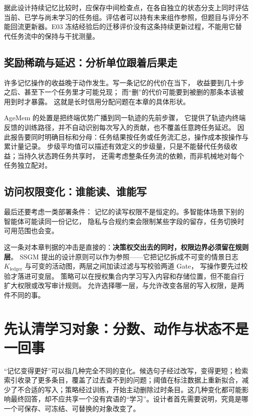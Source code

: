 据此设计持续记忆比较时，应保存中间检查点，在各自独立的状态分支上同时评估当前、已学与尚未学习的任务组。评估者可以持有未来组作参照，但题目与评分不能回流更新器。E03 冻结经验后的迁移评价没有这条持续更新过程，不能用它替代任务流中的保持与干扰测量。

\subsection*{奖励稀疏与延迟：分析单位跟着后果走}

许多记忆操作的收益晚于动作发生。写一条记忆的代价在当下，
收益要到几十步之后、甚至下一个任务里才可能兑现；
而“删”的代价可能要到被删的那条本该被用到时才暴露。
这就是长时信用分配问题在本章的具体形状。

AgeMem 的处置是把终端优势广播到同一轨迹的先前步骤\cite{agemem-2601}，
它提供了轨迹内终端反馈的训练路径，并不自动识别每次写入的贡献，也不覆盖任意跨任务延迟。
因此报告要同时明确目标和分母：任务结果按任务或任务流汇总，操作成本按操作与累计量记录。
步级平均值可以描述有效定义的步级量，只是不能替代任务级收益；当持久状态跨任务共享时，
还需考虑整条任务流的依赖，而非机械地对每个任务独立配对。

\subsection*{访问权限变化：谁能读、谁能写}

最后还要考虑一类部署条件：
记忆的读写权限不是恒定的。多智能体场景下别的智能体可能读同一份记忆，
隐私与合规约束会限制某些字段的留存，任务切换时可用范围也会变。

这一条对本章判据的冲击是直接的：\textbf{决策权交出去的同时，权限边界必须留在规则层}。
SSGM 提出的设计原则可以作为参照——它把记忆拆成不可变的情景日志 $K_{\text{ledger}}$
与可变的活动图，两层之间加读过滤与写校验两道 Gate，
写操作要先过校验才落进可变层\cite{ssgm-2603}。
策略可以在授权集合内学习写入内容和存储位置，但不能自行扩大权限或改写审计规则。
允许选择哪一层，与允许改变各层的写入权限，是两件不同的事。

\section{先认清学习对象：分数、动作与状态不是一回事}
\label{sec:ch06-object}

“记忆变得更好”可以指几种完全不同的变化。候选句子经过改写，变得更短；检索索引收录了更多条目，覆盖了过去查不到的问题；阈值在标注数据上重新拟合，减少了不合适的写入；策略经过训练，开始主动删除过时条目。这几种变化都可能影响最终回答，却不应共享一个没有宾语的“学习”。设计者首先需要说明，究竟是哪一个可保存、可冻结、可替换的对象改变了。

